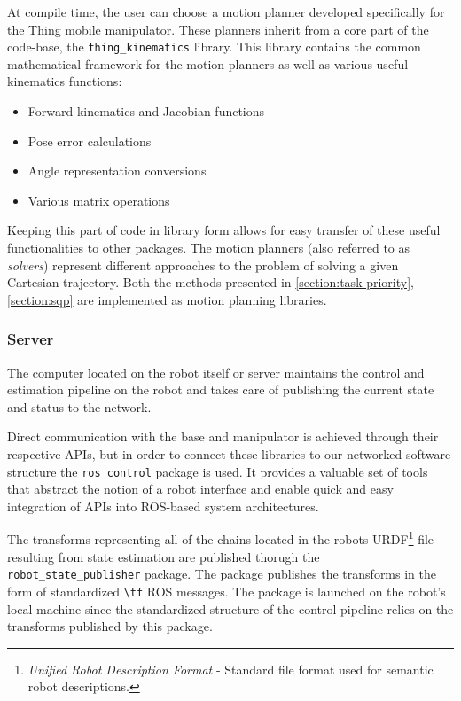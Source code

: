 \documentclass[times, utf8, diplomski, english]{fer}
\begin{document}
At compile time, the user can choose a motion planner developed specifically for the Thing mobile manipulator.
These planners inherit from a core part of the code-base, the \verb|thing_kinematics| library.
This library contains the common mathematical framework for the motion planners as well as various useful kinematics functions:
\begin{itemize}
  \item Forward kinematics and Jacobian functions
  \item Pose error calculations
  \item Angle representation conversions
  \item Various matrix operations
\end{itemize}
Keeping this part of code in library form allows for easy transfer of these useful functionalities to other packages.
The motion planners (also referred to as \textit{solvers}) represent different approaches to the problem of solving a given Cartesian trajectory.
Both the methods presented in \ref{section:task priority}, \ref{section:sqp} are implemented as motion planning libraries.

\subsubsection{Server}
The computer located on the robot itself or server maintains the control and estimation pipeline on the robot and takes care of publishing the current state and status to the network.

Direct communication with the base and manipulator is achieved through their respective APIs, but in order to connect these libraries to our networked software structure the \verb|ros_control| package is used. 
It provides a valuable set of tools that abstract the notion of a robot interface and enable quick and easy integration of APIs into ROS-based system architectures.

The transforms representing all of the chains located in the robots URDF\footnote{\textit{Unified Robot Description Format} - Standard file format used for semantic robot descriptions.} file resulting from state estimation are published thorugh the \verb|robot_state_publisher| package. The package publishes the transforms in the form of standardized \verb|\tf| ROS messages.
The package is launched on the robot's local machine since the standardized structure of the control pipeline relies on the transforms published by this package.
\end{document}
